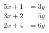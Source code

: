 \documentclass[preview]{standalone}
\begin{document}
\begin{align*}
5x + 1 &= 3y\\3x+2 &= 5y \\2x+4 &= 6y
\end{align*}
\end{document}
